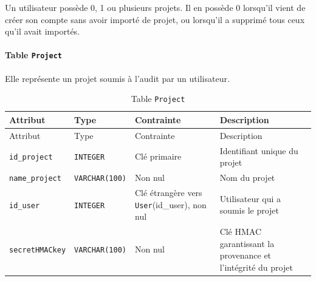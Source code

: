 \documentclass[a4paper,12pt]{article}
\begin{document}
Un utilisateur possède 0, 1 ou plusieurs projets. Il en possède 0
lorsqu'il vient de créer son compte sans avoir importé de projet, ou
lorsqu'il a supprimé tous ceux qu'il avait importés.

\paragraph*{\texorpdfstring{Table
\texttt{Project}}{Table Project}}\label{table-project}

Elle représente un projet soumis à l'audit par un utilisateur.

\begin{longtable}[]{@{}
  >{\raggedright\arraybackslash}p{}
  >{\raggedright\arraybackslash}p{}
  >{\raggedright\arraybackslash}p{}
  >{\raggedright\arraybackslash}p{}@{}}
\caption{Table \protect\texttt{Project}}\tabularnewline
\toprule\noalign{}
\begin{minipage}[b]{\linewidth}\raggedright
Attribut
\end{minipage} & \begin{minipage}[b]{\linewidth}\raggedright
Type
\end{minipage} & \begin{minipage}[b]{\linewidth}\raggedright
Contrainte
\end{minipage} & \begin{minipage}[b]{\linewidth}\raggedright
Description
\end{minipage} \\
\midrule\noalign{}
\endfirsthead
\toprule\noalign{}
\begin{minipage}[b]{\linewidth}\raggedright
Attribut
\end{minipage} & \begin{minipage}[b]{\linewidth}\raggedright
Type
\end{minipage} & \begin{minipage}[b]{\linewidth}\raggedright
Contrainte
\end{minipage} & \begin{minipage}[b]{\linewidth}\raggedright
Description
\end{minipage} \\
\midrule\noalign{}
\endhead
\bottomrule\noalign{}
\endlastfoot
\texttt{id\_\allowbreak{}project} & \texttt{INTEGER} & Clé primaire &
Identifiant unique du projet \\
\texttt{name\_\allowbreak{}project} &
\texttt{VARCHAR(\allowbreak{}100)\allowbreak{}} & Non nul & Nom du
projet \\
\texttt{id\_user} & \texttt{INTEGER} & Clé étrangère vers
\texttt{User}(id\_user), non nul & Utilisateur qui a soumis le projet \\
\texttt{secretHMACkey} & \texttt{VARCHAR(\allowbreak{}100)\allowbreak{}}
& Non nul & Clé HMAC garantissant la provenance et l'intégrité du
projet \\
\end{longtable}
\end{document}
